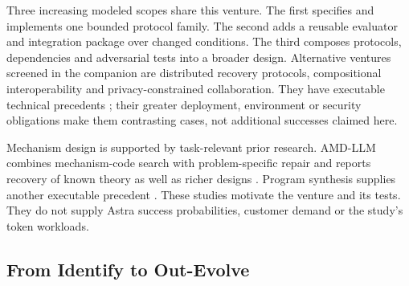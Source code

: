 \documentclass[11pt,letterpaper]{article}
\begin{document}
Three increasing modeled scopes share this venture. The first specifies and
implements one bounded protocol family. The second adds a reusable evaluator
and integration package over changed conditions. The third composes protocols,
dependencies and adversarial tests into a broader design. Alternative ventures
screened in the companion are distributed recovery protocols, compositional
interoperability and privacy-constrained collaboration. They have executable
technical precedents \citep{shardstore,compositional-synthesis,spdz}; their greater
deployment, environment or security obligations make them contrasting cases,
not additional successes claimed here.

Mechanism design is supported by task-relevant prior research. AMD-LLM combines
mechanism-code search with problem-specific repair and reports recovery of known
theory as well as richer designs \citep{amd-llm}. Program synthesis supplies
another executable precedent \citep{program-synthesis}. These studies motivate
the venture and its tests. They do not supply Astra success probabilities,
customer demand or the study's token workloads.

\subsection{From Identify to Out-Evolve}
\end{document}
